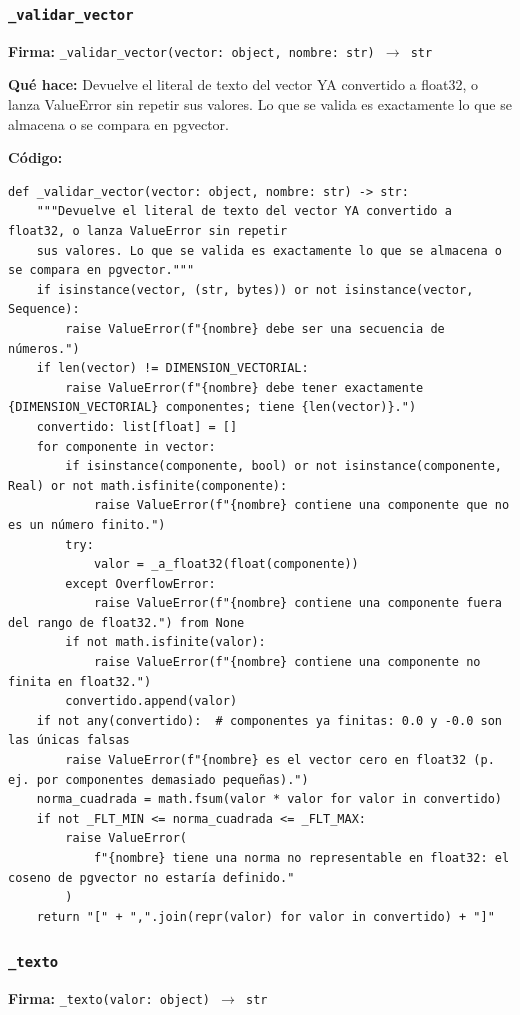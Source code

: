 \documentclass[11pt,a4paper]{article}
\begin{document}
\subsubsection*{\texttt{\_validar\_vector}}
\textbf{Firma:} \texttt{\_validar\_vector(vector: object, nombre: str) $\rightarrow$ str}

\textbf{Qué hace:} Devuelve el literal de texto del vector YA convertido a float32, o lanza ValueError sin repetir
sus valores. Lo que se valida es exactamente lo que se almacena o se compara en pgvector.

\textbf{Código:}
\begin{lstlisting}
def _validar_vector(vector: object, nombre: str) -> str:
    """Devuelve el literal de texto del vector YA convertido a float32, o lanza ValueError sin repetir
    sus valores. Lo que se valida es exactamente lo que se almacena o se compara en pgvector."""
    if isinstance(vector, (str, bytes)) or not isinstance(vector, Sequence):
        raise ValueError(f"{nombre} debe ser una secuencia de números.")
    if len(vector) != DIMENSION_VECTORIAL:
        raise ValueError(f"{nombre} debe tener exactamente {DIMENSION_VECTORIAL} componentes; tiene {len(vector)}.")
    convertido: list[float] = []
    for componente in vector:
        if isinstance(componente, bool) or not isinstance(componente, Real) or not math.isfinite(componente):
            raise ValueError(f"{nombre} contiene una componente que no es un número finito.")
        try:
            valor = _a_float32(float(componente))
        except OverflowError:
            raise ValueError(f"{nombre} contiene una componente fuera del rango de float32.") from None
        if not math.isfinite(valor):
            raise ValueError(f"{nombre} contiene una componente no finita en float32.")
        convertido.append(valor)
    if not any(convertido):  # componentes ya finitas: 0.0 y -0.0 son las únicas falsas
        raise ValueError(f"{nombre} es el vector cero en float32 (p. ej. por componentes demasiado pequeñas).")
    norma_cuadrada = math.fsum(valor * valor for valor in convertido)
    if not _FLT_MIN <= norma_cuadrada <= _FLT_MAX:
        raise ValueError(
            f"{nombre} tiene una norma no representable en float32: el coseno de pgvector no estaría definido."
        )
    return "[" + ",".join(repr(valor) for valor in convertido) + "]"
\end{lstlisting}

\subsubsection*{\texttt{\_texto}}
\textbf{Firma:} \texttt{\_texto(valor: object) $\rightarrow$ str}
\end{document}
